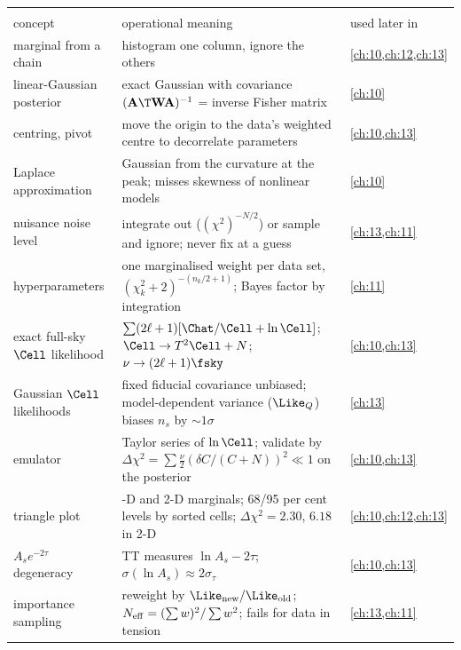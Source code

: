 \begin{center}
\small
\renewcommand{\arraystretch}{1.15}
\begin{tabularx}{\linewidth}{@{}>{\raggedright\arraybackslash}p{3.3cm}
                               >{\raggedright\arraybackslash}X
                               >{\raggedright\arraybackslash}p{2.3cm}@{}}
\toprule
\multicolumn{3}{@{}l}{\textbf{MCMC at work}}\\
concept & operational meaning & used later in\\\midrule
marginal from a chain & histogram one column, ignore the others & \cref{ch:10,ch:12,ch:13}\\
linear-Gaussian posterior & exact Gaussian with covariance $(\mathbf A\T\mathbf W\mathbf A)^{-1}$ = inverse Fisher matrix & \cref{ch:10}\\
centring, pivot & move the origin to the data's weighted centre to decorrelate parameters & \cref{ch:10,ch:13}\\
Laplace approximation & Gaussian from the curvature at the peak; misses skewness of nonlinear models & \cref{ch:10}\\
nuisance noise level & integrate out ($(\chi^2)^{-N/2}$) or sample and ignore; never fix at a guess & \cref{ch:13,ch:11}\\
hyperparameters & one marginalised weight per data set, $(\chi^2_k+2)^{-(n_k/2+1)}$; Bayes factor by integration & \cref{ch:11}\\
exact full-sky $\Cell$ likelihood & $\sum(2\ell+1)[\Chat/\Cell+\ln\Cell]$; $\Cell\to T^2\Cell+N$; $\nu\to(2\ell+1)\fsky$ & \cref{ch:10,ch:13}\\
Gaussian $\Cell$ likelihoods & fixed fiducial covariance unbiased; model-dependent variance ($\Like_Q$) biases $n_s$ by $\sim1\sigma$ & \cref{ch:13}\\
emulator & Taylor series of $\ln\Cell$; validate by $\Delta\chi^2=\sum\frac\nu2(\delta C/(C+N))^2\ll1$ on the posterior & \cref{ch:10,ch:13}\\
triangle plot & 1-D and 2-D marginals; 68/95 per cent levels by sorted cells; $\Delta\chi^2=2.30$, $6.18$ in 2-D & \cref{ch:10,ch:12,ch:13}\\
$A_se^{-2\tau}$ degeneracy & TT measures $\ln A_s-2\tau$; $\sigma(\ln A_s)\approx2\sigma_\tau$ & \cref{ch:10,ch:13}\\
importance sampling & reweight by $\Like_{\rm new}/\Like_{\rm old}$; $N_{\rm eff}=(\sum w)^2/\sum w^2$; fails for data in tension & \cref{ch:13,ch:11}\\
\bottomrule
\end{tabularx}
\end{center}
  